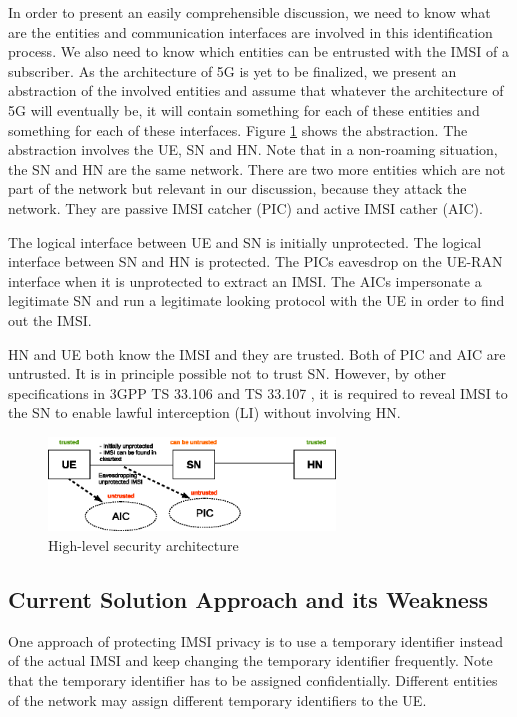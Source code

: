 \documentclass{llncs} %
\begin{document}
In order to present an easily comprehensible discussion, we need to know what are the entities and communication interfaces are involved in this identification process. We also need to know which entities can be entrusted with the IMSI of a subscriber. As the architecture of 5G is yet to be finalized, we present an abstraction of the involved entities and assume that whatever the architecture of 5G will eventually be, it will contain something for each of these entities and something for each of these interfaces. Figure \ref{fig:security_architecture_abstraction} shows the abstraction. The abstraction involves the UE, SN and HN. Note that in a non-roaming situation, the SN and HN are the same network. There are two more entities which are not part of the network but relevant in our discussion, because they attack the network. They are passive IMSI catcher (PIC) and active IMSI cather (AIC). 

The logical interface between UE and SN is initially unprotected. The logical interface between SN and HN is protected. The PICs eavesdrop on the UE-RAN interface when it is unprotected to extract an IMSI. The AICs impersonate a legitimate SN and run a legitimate looking protocol with the UE in order to find out the IMSI. 


HN and UE both know the IMSI and they are trusted. Both of PIC and AIC are untrusted. It is in principle possible not to trust SN. However, by other specifications in 3GPP TS 33.106 \cite{TS33106} and TS 33.107 \cite{TS33107}, it is required to reveal IMSI to the SN to enable lawful interception (LI) without involving HN. \begin{figure}
\vspace{-.50 cm}
\begin{center}
  \includegraphics[height= 2.5cm]{security_architecture_abstraction.eps}
\caption{High-level security architecture}
\label{fig:security_architecture_abstraction}       %
\end{center}
\end{figure} 
\vspace{-1.50 cm}
\subsection{Current Solution Approach and its Weakness}
One approach of protecting IMSI privacy is to use a temporary identifier instead of the actual IMSI and keep changing the temporary identifier frequently. Note that the temporary identifier has to be assigned confidentially. Different entities of the network may assign different temporary identifiers to the UE. 
\end{document}
